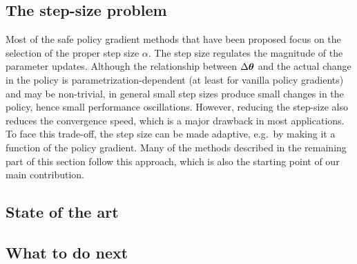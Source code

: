 \subsection{The step-size problem}
Most of the safe policy gradient methods that have been proposed focus on the selection of the proper step size $\alpha$.
The step size regulates the magnitude of the parameter updates. Although the relationship between $\Delta\boldsymbol{\theta}$ and the actual change in the policy is parametrization-dependent (at least for vanilla policy gradients) and may be non-trivial, in general small step sizes produce small changes in the policy, hence small performance oscillations. However, reducing the step-size also reduces the convergence speed, which is a major drawback in most applications. To face this trade-off, the step size can be made adaptive, e.g.\ by making it a function of the policy gradient. Many of the methods described in the remaining part of this section follow this approach, which is also the starting point of our main contribution.

\subsection{State of the art}
\subsection{What to do next}